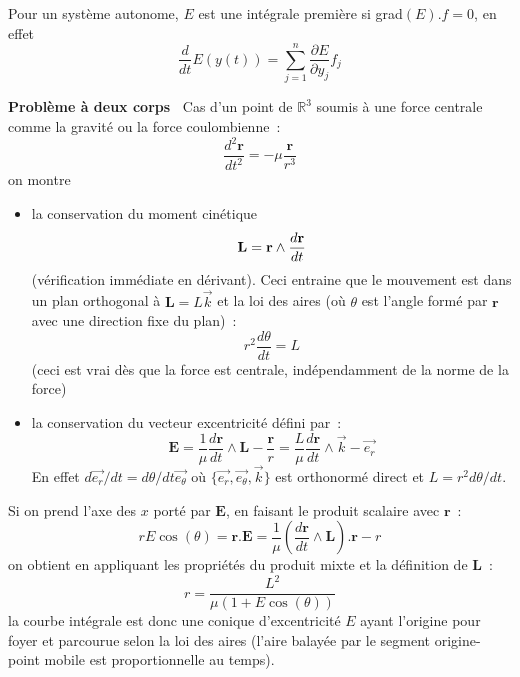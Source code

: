 \documentclass[a4paper,11pt]{book}
\begin{document}
\begin{giacjshere}
Pour un syst\`eme autonome, $E$ est une int\'egrale premi\`ere si
grad$(E).f=0$, en effet
$$ \frac{d}{dt} E(y(t))= \sum_{j=1}^n \frac{\partial E}{\partial y_j} f_j$$

{\bf Probl\`eme \`a deux corps~} 
Cas d'un point de $\mathbb{R}^3$
soumis \`a une force centrale
comme la gravit\'e ou la force coulombienne~:
$$\frac{d^2 {\mathbf r}}{dt^2}=-\mu \frac{{\mathbf r}}{r^3}$$ 
on montre
\begin{itemize}
\item  la conservation du moment cin\'etique 
$${\bf L}=
{\mathbf r} \wedge \frac{d {\mathbf r}}{dt}$$
(v\'erification imm\'ediate en d\'erivant).
Ceci entraine que
le mouvement est dans un plan orthogonal \`a 
${\mathbf L}=L \overrightarrow{k}$
et la loi des aires (o\`u $\theta$ est l'angle form\'e par 
${\mathbf r}$ avec une direction fixe du plan)~:
$$r^2 \frac{d\theta}{dt}=L$$
(ceci est vrai d\`es que la force est centrale, ind\'ependamment
de la norme de la force)
\item la conservation du vecteur excentricit\'e d\'efini par~:
\[ {\mathbf E}= \frac{1}{\mu} \frac{d{\mathbf r}}{dt} \wedge 
{\mathbf L} - \frac{{\mathbf r}}{r} 
= \frac{L }{\mu} \frac{d{\mathbf r}}{dt} \wedge 
\overrightarrow{k} - \overrightarrow{e_r} \]
En effet $d \overrightarrow{e_r}/dt=d\theta/dt
\overrightarrow{e_\theta}$ o\`u $\{ \overrightarrow{e_r},
\overrightarrow{e_\theta}, \overrightarrow{k} \}$ est orthonorm\'e direct
et $L=r^2 d\theta/dt$.
\end{itemize}
Si on prend l'axe des $x$ port\'e par ${\mathbf E}$,
en faisant le produit scalaire avec ${\mathbf r}$~:
$$rE \cos(\theta)={\mathbf r}.{\mathbf E}
= \frac{1}{\mu} 
(\frac{d{\mathbf r}}{dt} \wedge {\mathbf L}) . {\mathbf r} - r$$
on obtient en appliquant les propri\'et\'es du produit mixte et la
d\'efinition de ${\mathbf L}$~:
\[ r = \frac{L^2}{\mu(1+E \cos(\theta))}\]
la courbe int\'egrale est donc une conique d'excentricit\'e $E$
ayant l'origine pour foyer et parcourue selon la loi des aires
(l'aire balay\'ee par le segment origine-point mobile est
proportionnelle au temps).


\end{giacjshere}
\end{document}
